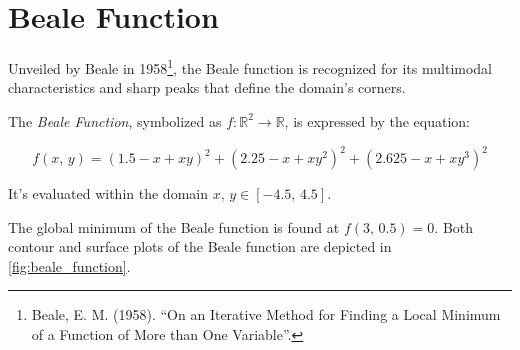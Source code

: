 \section{Beale Function}
\label{sec:beale_function}

Unveiled by Beale in 1958\footnote{
  Beale, E. M. (1958). \enquote{On an Iterative Method for Finding a Local 
  Minimum of a Function of More than One Variable}. 
}, the Beale function is recognized for its multimodal characteristics and 
sharp peaks that define the domain's corners.

\begin{definition}
  \label{def:beale_function}
  The \emph{Beale Function}, symbolized as \(f: \mathbb{R}^2 \rightarrow 
  \mathbb{R}\), is expressed by the equation:

  \begin{equation}
  \label{eq:beale_function}
    f(x,\,y) = (1.5 - x + xy)^2 + (2.25 - x + xy^2)^2 + (2.625 - x + xy^3)^2
  \end{equation}

  It's evaluated within the domain \(x,\, y \in [-4.5,\,4.5]\).
\end{definition}

The global minimum of the Beale function is found at \(f(3,\,0.5) = 0\).
Both contour and surface plots of the Beale function are depicted in 
\vref{fig:beale_function}.

